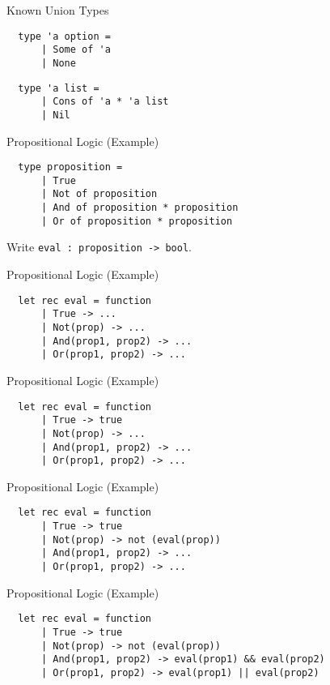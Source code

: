 \documentclass{beamer}
\begin{document}

\begin{frame}[fragile]{Known Union Types}
  \begin{verbatim}
  type 'a option =
      | Some of 'a
      | None
  \end{verbatim}
  \pause
  \begin{verbatim}
  type 'a list = 
      | Cons of 'a * 'a list
      | Nil
  \end{verbatim}
\end{frame}

\begin{frame}[fragile]{Propositional Logic (Example)}
  \begin{verbatim}
  type proposition =
      | True
      | Not of proposition
      | And of proposition * proposition
      | Or of proposition * proposition
  \end{verbatim}
  Write \texttt{eval : proposition -> bool}.
\end{frame}

\begin{frame}[fragile]{Propositional Logic (Example)}
  \begin{verbatim}
  let rec eval = function
      | True -> ...
      | Not(prop) -> ...
      | And(prop1, prop2) -> ...
      | Or(prop1, prop2) -> ...
  \end{verbatim}
\end{frame}

\begin{frame}[fragile]{Propositional Logic (Example)}
  \begin{verbatim}
  let rec eval = function
      | True -> true
      | Not(prop) -> ...
      | And(prop1, prop2) -> ...
      | Or(prop1, prop2) -> ...
  \end{verbatim}
\end{frame}

\begin{frame}[fragile]{Propositional Logic (Example)}
  \begin{verbatim}
  let rec eval = function
      | True -> true
      | Not(prop) -> not (eval(prop))
      | And(prop1, prop2) -> ...
      | Or(prop1, prop2) -> ...
  \end{verbatim}
\end{frame}

\begin{frame}[fragile]{Propositional Logic (Example)}
  \begin{verbatim}
  let rec eval = function
      | True -> true
      | Not(prop) -> not (eval(prop))
      | And(prop1, prop2) -> eval(prop1) && eval(prop2)
      | Or(prop1, prop2) -> eval(prop1) || eval(prop2)
  \end{verbatim}
\end{frame}
\end{document}

